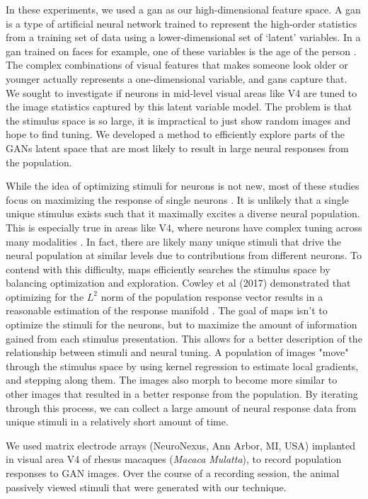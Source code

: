 In these experiments, we used a \gls{gan} as our high-dimensional feature space. A \gls{gan} is a type of artificial neural network trained to represent the high-order statistics from a training set of data using a lower-dimensional set of `latent’ variables. In a \gls{gan} trained on faces for example, one of these variables is the age of the person \parencite{Karras2019}. The complex combinations of visual features that makes someone look older or younger actually represents a one-dimensional variable, and \glspl{gan} capture that. We sought to investigate if neurons in mid-level visual areas like V4 are tuned to the image statistics captured by this latent variable model. The problem is that the stimulus space is so large, it is impractical to just show random images and hope to find tuning. We developed a method to efficiently explore parts of the GANs latent space that are most likely to result in large neural responses from the population. 

While the idea of optimizing stimuli for neurons is not new, most of these studies focus on maximizing the response of single neurons \parencite{Ponce2019, Bashivan2019}.  It is unlikely that a single unique stimulus exists such that it maximally excites a diverse neural population. This is especially true in areas like V4, where neurons have complex tuning across many modalities \parencite{Pasupathy2002}. In fact, there are likely many unique stimuli that drive the neural population at similar levels due to contributions from different neurons. To contend with this difficulty, \gls{maps} efficiently searches the stimulus space by balancing optimization and exploration. Cowley et al (2017) demonstrated that optimizing for the $L^2$ norm of the population response vector results in a reasonable estimation of the response manifold \parencite{Cowley2017}. The goal of \gls{maps} isn't to optimize the stimuli for the neurons, but to maximize the amount of information gained from each stimulus presentation. This allows for a better description of the relationship between stimuli and neural tuning. A population of images "move" through the stimulus space by using kernel regression to estimate local gradients, and stepping along them. The images also morph to become more similar to other images that resulted in a better response from the population. By iterating through this process, we can collect a large amount of neural response data from unique stimuli in a relatively short amount of time. 


We used matrix electrode arrays (NeuroNexus, Ann Arbor, MI, USA) implanted in visual area V4 of rhesus macaques ({\it Macaca Mulatta}), to record population responses to GAN images. Over the course of a recording session, the animal passively viewed stimuli that were generated with our technique.


